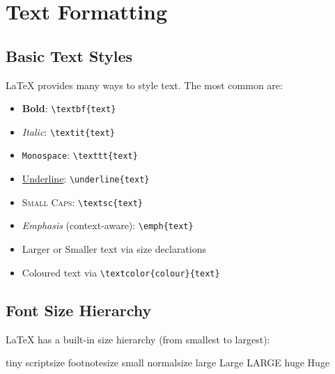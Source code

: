 \documentclass[12pt, a4paper]{article}
\theoremstyle{definition}
\theoremstyle{plain}
\theoremstyle{remark}
\begin{document}
\section{Text Formatting}
\label{sec:text}

\subsection{Basic Text Styles}

\LaTeX{} provides many ways to style text.  The most common are:

\begin{itemize}[
    leftmargin = 1.5em,
    itemsep    = 4pt,
    label      = \textcolor{AccentOrange}{\textbullet}]  %
  \item \textbf{Bold}: \verb|\textbf{text}|
  \item \textit{Italic}: \verb|\textit{text}|
  \item \texttt{Monospace}: \verb|\texttt{text}|
  \item \underline{Underline}: \verb|\underline{text}|
  \item \textsc{Small Caps}: \verb|\textsc{text}|
  \item \emph{Emphasis} (context-aware): \verb|\emph{text}|
  \item {\large Larger} or {\small Smaller} text via size declarations
  \item \textcolor{AccentOrange}{Coloured text} via \verb|\textcolor{colour}{text}|
\end{itemize}

\subsection{Font Size Hierarchy}

\LaTeX{} has a built-in size hierarchy (from smallest to largest):

\begin{center}
  {\tiny tiny} \quad
  {\scriptsize scriptsize} \quad
  {\footnotesize footnotesize} \quad
  {\small small} \quad
  {\normalsize normalsize} \quad
  {\large large} \quad
  {\Large Large} \quad
  {\LARGE LARGE} \quad
  {\huge huge} \quad
  {\Huge Huge}
\end{center}
\end{document}
